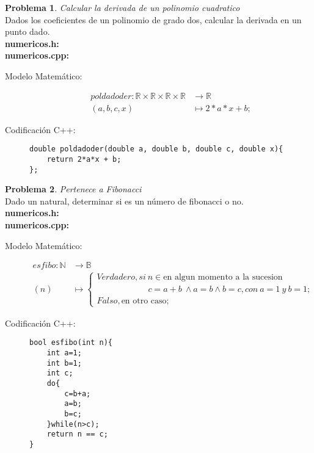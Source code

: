 \documentclass{article}
\theoremstyle{plain}
\theoremstyle{definition}
\newtheorem{problem}{Problema}
\begin{document}
\begin{problem} \emph{Calcular la derivada de un polinomio cuadratico}\\
Dados los coeficientes de un polinomio de grado dos, calcular la derivada en un punto dado.\\
\textbf{numericos.h:}\ \\
\textbf{numericos.cpp:}\ 
%
\begin{description}
\item[Modelo Matemático:]
%
\begin{align*}
pol dado der: \mathbb{R}\times\mathbb{R}\times\mathbb{R}\times\mathbb{R} &\to \mathbb{R}\\
(a,b,c,x) &\mapsto 2*a*x + b;
\end{align*}
%
\item[Codificación \textsf{C++}:]\hfill
%
\begin{verbatim}
double poldadoder(double a, double b, double c, double x){
    return 2*a*x + b;
};
\end{verbatim}
\end{description}
\end{problem}

\begin{problem} \emph{Pertenece a Fibonacci}\\
Dado un natural, determinar si es un número de fibonacci o no.\\
\textbf{numericos.h:}\ \\
\textbf{numericos.cpp:}\ 
%
\begin{description}
\item[Modelo Matemático:]
%
\begin{align*}
es fibo: \mathbb{N} &\to \mathbb{B}\\
(n) &\mapsto 
\begin{cases}
Verdadero, si\ n\in \text{en algun momento a la sucesion}\\ 
\quad\quad\quad\quad\quad\quad c = a+b\ \wedge a=b \wedge b=c, con\ a=1\ y\ b=1;\\
Falso, \text{en otro caso;}
\end{cases}
\end{align*}
%
\item[Codificación \textsf{C++}:]\hfill
%
\begin{verbatim}
bool esfibo(int n){
    int a=1;
    int b=1;
    int c;
    do{
        c=b+a;
        a=b;
        b=c;
    }while(n>c);
    return n == c;
}
\end{verbatim}
\end{description}
\end{problem}
\end{document}
